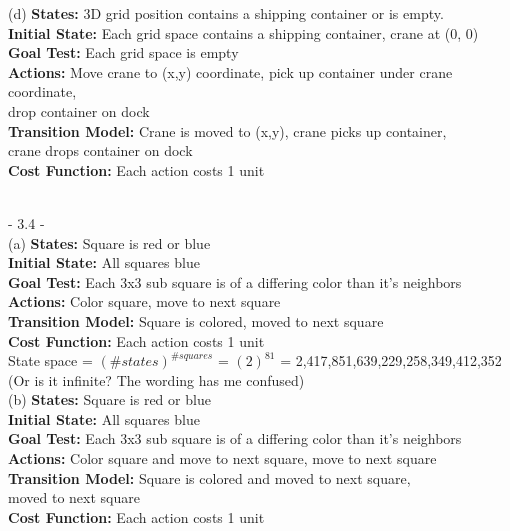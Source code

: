 \documentclass[12pt]{article}
\begin{document}
(d) \textbf{States:}				3D grid position contains a shipping container or is empty.\\
\indent\indent \textbf{Initial State:}		Each grid space contains a shipping container, crane at (0, 0)\\
\indent\indent \textbf{Goal Test:}			Each grid space is empty\\
\indent\indent \textbf{Actions:}			Move crane to (x,y) coordinate, pick up container under crane coordinate,\\ 
\indent\indent drop container on dock\\
\indent\indent \textbf{Transition Model:}	Crane is moved to (x,y), crane picks up container, \\ 
\indent\indent crane drops container on dock\\
\indent\indent \textbf{Cost Function:}		Each action costs 1 unit



\noindent \hrulefill \\



- 3.4 - \\

(a) \textbf{States:}				Square is red or blue\\
\indent\indent \textbf{Initial State:}		All squares blue\\
\indent\indent \textbf{Goal Test:	}		Each 3x3 sub square is of a differing color than it's neighbors\\
\indent\indent \textbf{Actions:}			Color square, move to next square\\
\indent\indent \textbf{Transition Model:}	Square is colored, moved to next square\\
\indent\indent \textbf{Cost Function:}		Each action costs 1 unit\\
	
\indent\indent State space = $(\#states)^{\#squares}$ = $(2)^{81}$ = 2,417,851,639,229,258,349,412,352\\
\indent\indent (Or is it infinite? The wording has me confused)\\

(b) \textbf{States:} 				Square is red or blue\\
\indent\indent \textbf{Initial State:}		All squares blue\\
\indent\indent \textbf{Goal Test:}		Each 3x3 sub square is of a differing color than it's neighbors\\
\indent\indent \textbf{Actions:}			Color square and move to next square, move to next square\\
\indent\indent \textbf{Transition Model:}	Square is colored and moved to next square, \\
\indent\indent moved to next square\\
\indent\indent \textbf{Cost Function:}		Each action costs 1 unit\\
	
\end{document}
